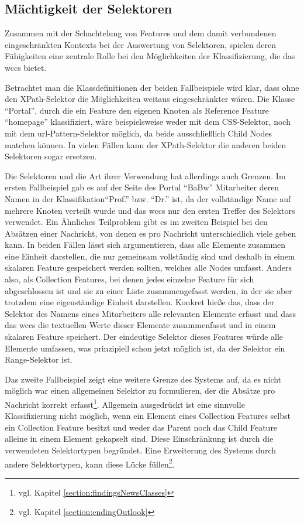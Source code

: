 \subsection{Mächtigkeit der Selektoren}
    \label{section:discussionInterpretationSelectors}
    Zusammen mit der Schachtelung von Features und dem
    damit verbundenen eingeschränkten Kontexts bei der
    Auswertung von Selektoren,
    spielen deren Fähigkeiten eine zentrale Rolle bei den
    Möglichkeiten der Klassifizierung, die das \gls{wccs} bietet.

    Betrachtet man die Klassdefinitionen der beiden Fallbeispiele wird klar,
    dass ohne den XPath-Selektor die Möglichkeiten weitaus eingeschränkter wären.
    Die Klasse "`Portal"', durch die ein Feature den eigenen Knoten
    als Reference Feature "`homepage"' klassifiziert,
    wäre beispielsweise weder mit dem CSS-Selektor,
    noch mit dem \gls{url}-Pattern-Selektor möglich,
    da beide ausschließlich Child Nodes matchen können.
    In vielen Fällen kann der XPath-Selektor die anderen beiden Selektoren sogar ersetzen.
    
    Die Selektoren und die Art ihrer Verwendung hat allerdings auch Grenzen.
    Im ersten Fallbeispiel gab es auf der Seite des Portal "`BaBw"'
    Mitarbeiter deren Namen in der Klassifikation"`Prof."' bzw. "`Dr."' ist,
    da der vollständige Name auf mehrere Knoten verteilt wurde
    und das \gls{wccs} nur den ersten Treffer des Selektors verwendet.
    Ein Ähnliches Teilproblem gibt es im zweiten Beispiel bei den Absätzen einer Nachricht,
    von denen es pro Nachricht unterschiedlich viele geben kann.
    In beiden Fällen lässt sich argumentieren,
    dass alle Elemente zusammen eine Einheit darstellen,
    die nur gemeinsam vollständig sind und deshalb
    in einem skalaren Feature gespeichert werden sollten,
    welches alle Nodes umfasst.
    Anders also, als Collection Features,
    bei denen jedes einzelne Feature für sich abgeschlossen ist
    und sie zu einer Liste zusammengefasst werden,
    in der sie aber trotzdem eine eigenständige Einheit darstellen.
    Konkret hieße das, dass der Selektor des Namens eines Mitarbeiters
    alle relevanten Elemente erfasst und
    dass das \gls{wccs} die textuellen Werte dieser Elemente zusammenfasst
    und in einem skalaren Feature speichert.
    Der eindeutige Selektor dieses Features würde alle Elemente umfassen,
    was prinzipiell schon jetzt möglich ist,
    da der Selektor ein Range-Selektor ist.

    Das zweite Fallbeispiel zeigt eine weitere Grenze des Systems auf,
    da es nicht möglich war einen allgemeinen Selektor zu formulieren,
    der die Absätze pro Nachricht korrekt
    erfasst\footnote{vgl. Kapitel \ref{section:findingsNewsClasses}}.
    Allgemein ausgedrückt ist eine sinnvolle Klassifizierung nicht möglich,
    wenn ein Element eines Collection Features selbst ein Collection Feature besitzt
    und weder das Parent noch das Child Feature alleine in einem Element gekapselt sind.
    Diese Einschränkung ist durch die verwendeten Selektortypen begründet.
    Eine Erweiterung des Systems durch andere Selektortypen, kann diese Lücke
    füllen\footnote{vgl. Kapitel \ref{section:endingOutlook}}.